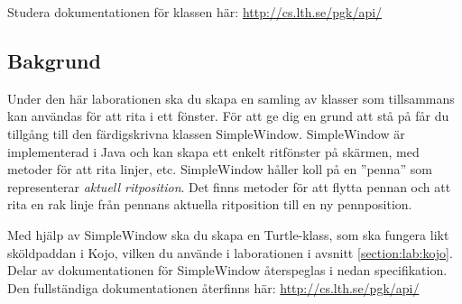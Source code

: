

\Lab{\LabWeekFIVE}

\begin{Goals}

\end{Goals}

\begin{Preparations}
\item {}

\item Studera dokumentationen för klassen  här: \url{http://cs.lth.se/pgk/api/}


\end{Preparations}

\subsection{Bakgrund}

Under den här laborationen ska du skapa en samling av klasser som tillsammans kan användas för att rita i ett fönster. För att ge dig en grund att stå på får du tillgång till den färdigskrivna klassen SimpleWindow. SimpleWindow är implementerad i Java och kan skapa ett enkelt ritfönster på skärmen, med metoder för att rita linjer, etc. SimpleWindow håller koll på en ''penna'' som representerar \textit{aktuell ritposition}. Det finns metoder för att flytta pennan och att rita en rak linje från pennans aktuella ritposition till en ny pennposition.

Med hjälp av SimpleWindow ska du skapa en Turtle-klass, som ska fungera likt sköldpaddan i Kojo, vilken du använde i laborationen i avsnitt \ref{section:lab:kojo}. Delar av dokumentationen för SimpleWindow återspeglas i nedan specifikation. Den fullständiga dokumentationen återfinns här: \url{http://cs.lth.se/pgk/api/}

